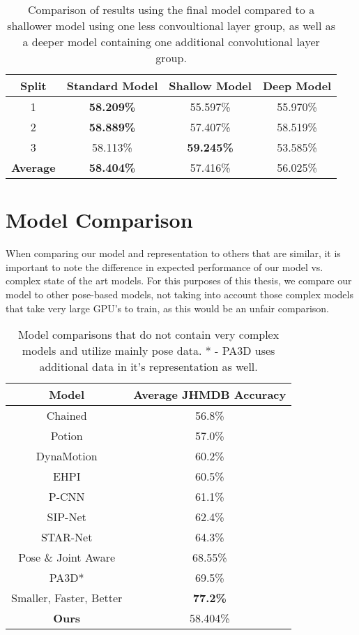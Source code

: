 \begin{table}[ht]
	\centering
	\begin{tabular}{||c c c c||} 
		\hline
		\textbf{Split} & \textbf{Standard Model} & \textbf{Shallow Model} & \textbf{Deep Model} \\ [0.5ex] 
		\hline\hline
		1 & \textbf{58.209\%} & 55.597\% & 55.970\% \\ 
		\hline
		2 & \textbf{58.889\%} & 57.407\% & 58.519\% \\
		\hline
		3 & 58.113\% & \textbf{59.245\%} & 53.585\% \\
		\hline
		\hline
		\textbf{Average} & \textbf{58.404\%} & 57.416\% & 56.025\% \\
		\hline
	\end{tabular}
	\caption{Comparison of results using the final model compared to a shallower model using one less convoultional layer group, as well as a deeper model containing one additional convolutional layer group.}
	\label{tab:acc-results-v-shallow-deep}
\end{table}

\section{Model Comparison}

When comparing our model and representation to others that are similar, it is important to note the difference in expected performance of our model vs. complex state of the art models. For this purposes of this thesis, we compare our model to other pose-based models, not taking into account those complex models that take very large GPU's to train, as this would be an unfair comparison.

\begin{table}[ht]
	\centering
	\begin{tabular}{||c c||} 
		\hline
		\textbf{Model} & \textbf{Average JHMDB Accuracy} \\
		\hline\hline
		Chained \cite{Chained} & 56.8\% \\
		Potion \cite{potion} & 57.0\% \\
		DynaMotion \cite{dynamic-motion} & 60.2\% \\
		EHPI \cite{simple_yet_efficient} & 60.5\% \\
		P-CNN \cite{PCNN} & 61.1\% \\
		SIP-Net \cite{sipnet} & 62.4\% \\
		STAR-Net \cite{star-net} & 64.3\% \\
		Pose \& Joint Aware \cite{poseandjointaware} & 68.55\% \\
		PA3D* \cite{PA3D} & 69.5\% \\
		Smaller, Faster, Better \cite{smaller_faster_better} & \textbf{77.2\%} \\
		\hline\hline
		\textbf{Ours} & 58.404\% \\
		\hline
	\end{tabular}
	\caption{Model comparisons that do not contain very complex models and utilize mainly pose data. * - PA3D uses additional data in it's representation as well.}
	\label{tab:model-comparison}
\end{table}

